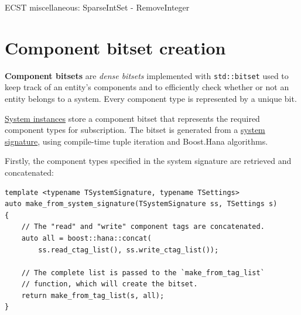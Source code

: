 \documentclass[oneside, 12pt, a4paper, openany]{book}
\begin{document}
\begin{algorithm}[H]

\caption{ECST miscellaneous: SparseIntSet - RemoveInteger}
\footnotesize



\end{algorithm}

\hypertarget{appendix_component_bitset_creation}{\section{Component
bitset creation}\label{appendix_component_bitset_creation}}

\textbf{Component bitsets} are \emph{dense bitsets} implemented with
\texttt{std::bitset}
used to keep track of an entity's components and to efficiently check
whether or not an entity belongs to a system. Every component type is
represented by a unique bit.

\protect\hyperlink{storage_system}{System instances} store a component
bitset that represents the required component types for subscription.
The bitset is generated from a \protect\hyperlink{system_sigs}{system
signature}, using compile-time tuple iteration and Boost.Hana
algorithms.

Firstly, the component types specified in the system signature are
retrieved and concatenated:

\begin{verbatim}
template <typename TSystemSignature, typename TSettings>
auto make_from_system_signature(TSystemSignature ss, TSettings s)
{
    // The "read" and "write" component tags are concatenated.
    auto all = boost::hana::concat(
        ss.read_ctag_list(), ss.write_ctag_list());

    // The complete list is passed to the `make_from_tag_list` 
    // function, which will create the bitset.
    return make_from_tag_list(s, all);
}
\end{verbatim}
\end{document}
